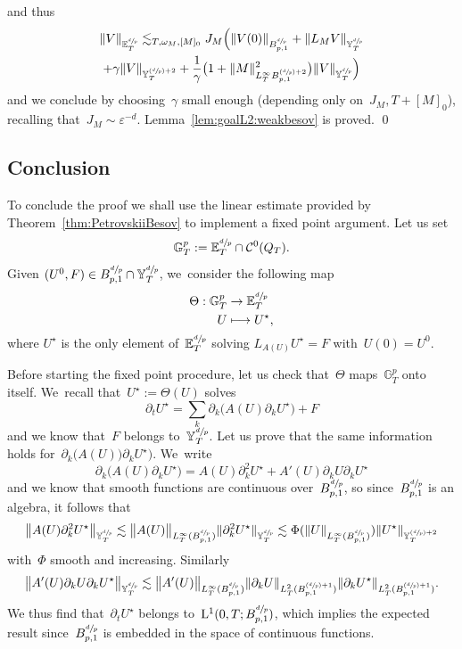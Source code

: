 \documentclass[10pt]{amsart}
\newcommand\mto{\mathchoice{\longmapsto}{\mapsto}{\mapsto}{\mapsto}}
\newcommand{\Psfrac}[2]{(\sfrac{#1}{#2})}
\theoremstyle{definition}
\renewcommand\L{\mathrm{L}}
\let\ep\varepsilon
\begin{document}
and thus
\begin{multline*}
\|V\|_{{\mathbb E}^{\sfrac dp}_T} \lesssim_{T,\omega_M,[M]_0} J_M\Bigl(\| V (0)\|_{B^{\sfrac dp}_{p,1}} + \| L_{M }V\|_{{\mathbb Y}^{\sfrac dp}_T} \\+ \gamma \|V\|_{{{\mathbb Y}^{\Psfrac dp+2}_T }} + \frac1\gamma\bigl(1+ \|M\|^2_{{L^\infty_T B^{\Psfrac dp+2}_{p,1} }} \bigr) \| V \|_{{\mathbb Y}^{\sfrac dp}_T} \Bigr)
\end{multline*}
and we conclude by choosing~$\gamma$ small enough (depending only on~$J_M, T + [M]_0$), recalling that~$J_M \sim \ep^{-d}$.
Lemma~\ref{lem:goalL2:weakbesov} is proved. \qed

\subsection{Conclusion}
To conclude the proof we shall use the linear estimate provided by Theorem~\ref{thm:PetrovskiiBesov} to implement a fixed point argument. Let us set
\[
\mathbb G^p_T:={\mathbb E}^{\sfrac dp}_T \cap \mathcal C^0(Q_T).
\]
Given $(U^0,F)\in B^{\sfrac dp}_{p,1}\cap {\mathbb Y}^{\sfrac dp}_T$, we~consider the following map
\begin{align*}
\Theta: \mathbb G^p_T&\to {\mathbb E}^{\sfrac dp}_T \\
U &\mto U^\star,
\end{align*}
where $U^\star$ is the only element of~${\mathbb E}^{\sfrac dp}_T$ solving $L_{A(U)} U^\star = F$ with~$U(0) = U^0$.

Before starting the fixed point procedure, let us check that~$\Theta$ maps~$ \mathbb G^p_T$ onto itself. We~recall that~$U^\star:=\Theta(U)$ solves
\[
\partial_tU^\star = \sum_k \partial_k \bigl(A(U)\partial_kU^\star\bigr) + F
\]
and we know that~$F$ belongs to~$ {\mathbb Y}^{\sfrac dp}_T$. Let us prove that the same information holds for~$\partial_k \bigl(A(U)\bigr)\partial_kU^\star\bigr)$. We~write
\[
\partial_k \bigl(A(U)\partial_kU^\star\bigr) = A(U)\partial^2_kU^\star + A'(U)\partial_kU \partial_kU^\star
\]
and we know that smooth functions are continuous over~$B^{\sfrac dp}_{p,1}$, so since~$B^{\sfrac dp}_{p,1}$ is an algebra, it follows that
\[
\big\| A(U)\partial^2_kU^\star \big\| _{ {\mathbb Y}^{\sfrac dp}_T} \lesssim \big\| A(U) \big\| _{L^\infty_T(B^{\sfrac dp}_{p,1})} \|\partial^2_k U^\star\| _{ {\mathbb Y}^{\sfrac dp}_T} \lesssim \Phi(\| U \| _{L^\infty_T(B^{\sfrac dp}_{p,1})})\|U^\star\| _{ {\mathbb Y}^{\Psfrac dp+2}_T}
\]
with~$\Phi$ smooth and increasing. Similarly
\[
\big\| A'(U)\partial_kU \partial_kU^\star
\big\| _{ {\mathbb Y}^{\sfrac dp}_T} \lesssim \big\| A'(U) \big\| _{L^\infty_T(B^{\sfrac dp}_{p,1})} \|\partial_k U \| _{L^2_T(B^{\Psfrac dp+1}_{p,1})} \|\partial_k U^\star\| _{L^2_T(B^{\Psfrac dp+1}_{p,1})}.
\]
We thus find that~$ \partial_tU^\star$ belongs to~$\L^1(0,T;B^{\sfrac dp}_{p,1})$, which implies the expected result since~$B^{\sfrac dp}_{p,1}$ is embedded in the space of continuous functions.
\end{document}
